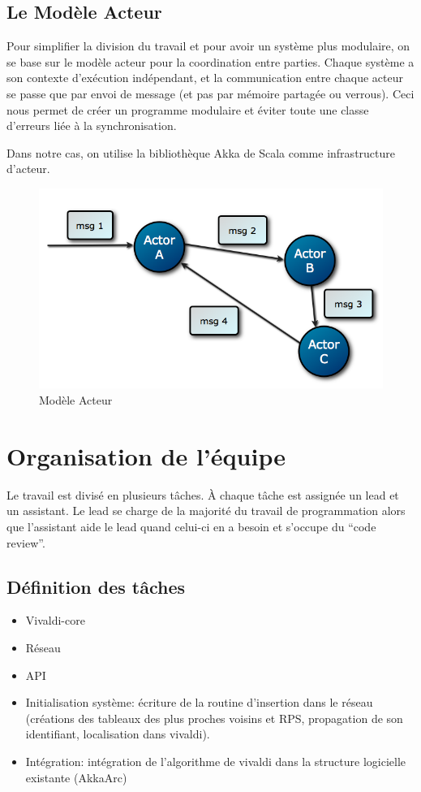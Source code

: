 \documentclass[11pt,a4paper]{article}
\begin{document}
\subsection{Le Modèle Acteur}

Pour simplifier la division du travail et pour avoir un système plus modulaire, on se base sur le modèle acteur pour la coordination entre parties. Chaque système a son contexte d’exécution indépendant, et la communication entre chaque acteur se passe que par envoi de message (et pas par mémoire partagée ou verrous). Ceci nous permet de créer un programme modulaire et éviter toute une classe d’erreurs liée à la synchronisation.

 Dans notre cas,  on utilise la bibliothèque Akka de Scala comme infrastructure d’acteur.
\begin{figure}[h]
   \caption{\label{acteur} Modèle Acteur}
   \includegraphics[scale=0.5]{acteur}
\end{figure}

\section{Organisation de l’équipe}

Le travail est divisé en plusieurs tâches. À chaque tâche est assignée un lead et un assistant. Le lead se charge de la majorité du travail de programmation alors que l’assistant aide le lead quand celui-ci en a besoin et s’occupe du “code review”. 

\subsection{Définition des tâches}
\begin{itemize}
\item Vivaldi-core
\item Réseau
\item API
\item Initialisation système: écriture de la routine d’insertion dans le réseau (créations des tableaux des plus proches voisins et RPS, propagation de son identifiant, localisation dans vivaldi).
\item Intégration: intégration de l’algorithme de vivaldi dans la structure logicielle existante (AkkaArc)
\end{itemize}
\end{document}
